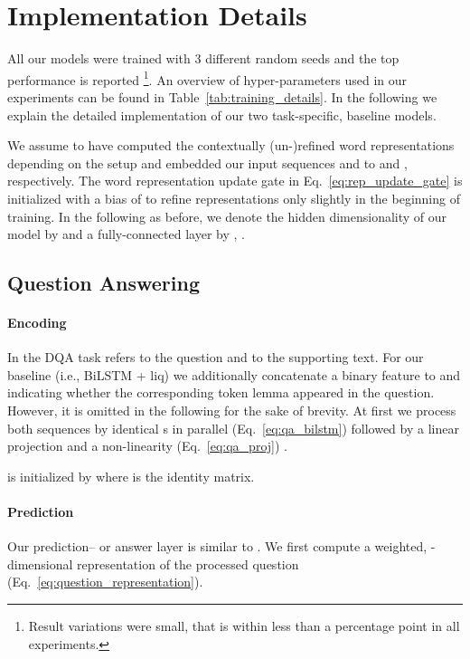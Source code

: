 \documentclass[11pt,a4paper]{article}
\begin{document}



\clearpage
\clearpage

\appendix

\section{Implementation Details}\label{sec:impl}

All our models were trained with 3 different random seeds and the top performance is reported \footnote{Result variations were small, that is within less than a percentage point in all experiments.}. An overview of hyper-parameters used in our experiments can be found in Table~\ref{tab:training_details}. In the following we explain the detailed implementation of our two task-specific, baseline models. 

We assume to have computed the contextually (un-)refined word representations depending on the setup and embedded our input sequences  and   to  and , respectively. The word representation update gate in Eq.~\ref{eq:rep_update_gate} is initialized with a bias of  to refine representations only slightly in the beginning of training. In the following as before, we denote the hidden dimensionality of our model by  and a fully-connected layer by , .

\subsection{Question Answering}\label{sec:qa_impl}

\paragraph{Encoding} In the DQA task  refers to the question and  to the supporting text. For our baseline (i.e., BiLSTM + liq) we additionally concatenate a binary feature to  and  indicating whether the corresponding token lemma appeared in the question. However, it is omitted in the following for the sake of brevity. At first we process both sequences by identical s in parallel (Eq.~\ref{eq:qa_bilstm}) followed by a linear projection and a  non-linearity (Eq.~\ref{eq:qa_proj}) .


\noindent
 is initialized by  where  is the identity matrix.

\paragraph{Prediction} Our prediction-- or answer layer is similar to . We first compute a weighted, -dimensional representation  of the processed question  (Eq.~\ref{eq:question_representation}).
\end{document}
